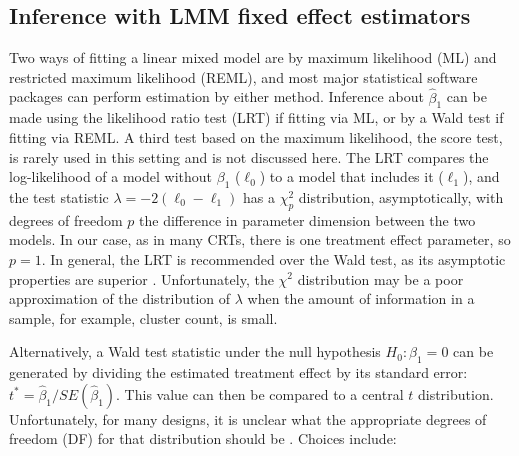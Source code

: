 \documentclass[twocolumn]{bmcart}%
\begin{document}
\subsection*{Inference with LMM fixed effect estimators}


Two ways of fitting a linear mixed model are by maximum likelihood (ML) and restricted maximum likelihood (REML), and most major statistical software packages can perform estimation by either method. Inference about $\hat{\beta}_1$ can be made using the likelihood ratio test (LRT) if fitting via ML, or by a Wald test if fitting via REML. A third test based on the maximum likelihood, the score test, is rarely used in this setting and is not discussed here. The LRT compares the log-likelihood of a model without $\beta_1$ ($\ell_0$) to a model that includes it ($\ell_1$), and the test statistic $\lambda = -2(\ell_0 - \ell_1)$ has a $\chi^2_p$ distribution, asymptotically, with degrees of freedom $p$ the difference in parameter dimension between the two models. In our case, as in many CRTs, there is one treatment effect parameter, so $p=1$. In general, the LRT is recommended over the Wald test, as its asymptotic properties are superior \cite{cox_theoretical_1979}.  Unfortunately, the $\chi^2$ distribution may be a poor approximation of the distribution of $\lambda$ when the amount of information in a sample, for example, cluster count, is small.


Alternatively, a Wald test statistic under the null hypothesis $H_0: \beta_1=0$ can be generated by dividing the estimated treatment effect by its standard error: $t^* =\hat{\beta}_1 / SE(\hat{\beta}_1)$.  This value can then be compared to a central $t$ distribution. Unfortunately, for many designs, it is unclear what the appropriate degrees of freedom (DF) for that distribution should be \cite{bates_fitting_2015}. Choices include:
\end{document}
